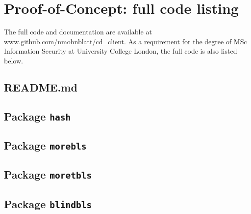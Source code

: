 \chapter{Proof-of-Concept: full code listing}
\label{app:code}

\lstset{captionpos=t}

\newcommand{\ImportGo}[1]{\vspace{2cm}}
\newcommand{\ImportGoTest}[1]{\vspace{2cm}}
\newcommand{\ImportGoWithTest}[1]{\vspace{2cm}   \vspace{2cm}}


The full code and documentation are available at \url{www.github.com/nmohnblatt/cd_client}. As a requirement for the degree of MSc Information Security at University College London, the full code is also listed below.



\section{README.md}


\section{Package \texttt{hash}}
\ImportGoWithTest{hash/hashing}

\section{Package \texttt{morebls}}
\label{app:morebls}
\ImportGoWithTest{morebls/morebls}


\section{Package \texttt{moretbls}}
\label{app:moretbls}
\ImportGoWithTest{moretbls/moretbls}

\section{Package \texttt{blindbls}}
\label{app:blindbls}
\ImportGoWithTest{blindbls/blindbls}

